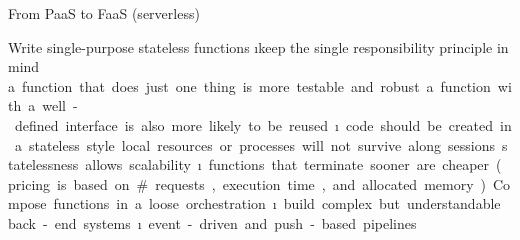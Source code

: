 \begin{frame}[allowframebreaks]{From PaaS to FaaS (serverless)}
\framebreak

Write single-purpose stateless functions
\i keep the single responsibility principle in mind
\si a function that does just one thing is more testable and robust
\si a function with a well-defined interface is also more likely to be reused
\i code should be created in a stateless style
\si local resources or processes will not survive along sessions
\si statelessness allows scalability
\i functions that terminate sooner are cheaper 
\si (pricing is based on \#requests, execution time, and allocated memory)

Compose functions in a loose orchestration
\i build complex but understandable back-end systems
\i event-driven and push-based pipelines
\end{frame}






